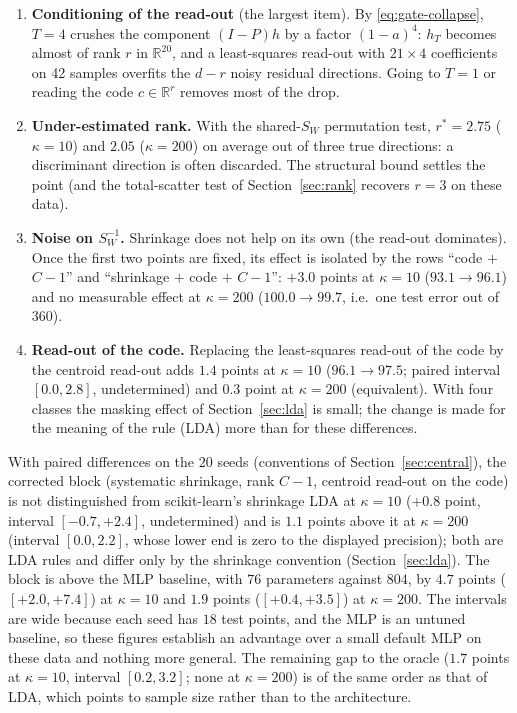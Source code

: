 \documentclass[11pt,a4paper]{article}
\theoremstyle{plain}
\theoremstyle{definition}
\theoremstyle{remark}
\newcommand{\R}{\mathbb R}
\begin{document}
\begin{enumerate}
  \item \textbf{Conditioning of the read-out} (the largest item). By
  \eqref{eq:gate-collapse}, $T=4$ crushes the component $(I-P)h$ by a factor
  $(1-a)^4$: $h_T$ becomes almost of rank $r$ in $\R^{20}$, and a
  least-squares read-out with $21\times4$ coefficients on 42 samples overfits
  the $d-r$ noisy residual directions. Going to $T=1$ or reading the code
  $c\in\R^r$ removes most of the drop.
  \item \textbf{Under-estimated rank.} With the shared-$S_W$ permutation
  test, $r^\ast=2.75$ ($\kappa=10$) and $2.05$ ($\kappa=200$) on average out
  of three true directions: a discriminant direction is often discarded. The
  structural bound settles the point (and the total-scatter test of
  Section~\ref{sec:rank} recovers $r=3$ on these data).
  \item \textbf{Noise on $S_W^{-1}$.} Shrinkage does not help on its own
  (the read-out dominates). Once the first two points are fixed, its effect
  is isolated by the rows ``code $+$ $C-1$'' and ``shrinkage $+$ code $+$
  $C-1$'': $+3.0$ points at $\kappa=10$ ($93.1\to96.1$) and no measurable
  effect at $\kappa=200$ ($100.0\to99.7$, i.e.\ one test error out of
  $360$).
  \item \textbf{Read-out of the code.} Replacing the least-squares read-out
  of the code by the centroid read-out adds $1.4$ points at $\kappa=10$
  ($96.1\to97.5$; paired interval $[0.0,2.8]$, undetermined) and $0.3$ point
  at $\kappa=200$ (equivalent). With four classes the masking effect of
  Section~\ref{sec:lda} is small; the change is made for the meaning of the
  rule (LDA) more than for these differences.
\end{enumerate}
With paired differences on the $20$ seeds (conventions of
Section~\ref{sec:central}), the corrected block (systematic shrinkage, rank
$C-1$, centroid read-out on the code) is not distinguished from
scikit-learn's shrinkage LDA at $\kappa=10$ ($+0.8$ point, interval
$[-0.7,+2.4]$, undetermined) and is $1.1$ points above it at $\kappa=200$
(interval $[0.0,2.2]$, whose lower end is zero to the displayed precision);
both are LDA rules and differ only by the shrinkage convention
(Section~\ref{sec:lda}). The block is above the MLP baseline, with $76$
parameters against $804$, by $4.7$ points ($[+2.0,+7.4]$) at $\kappa=10$
and $1.9$ points ($[+0.4,+3.5]$) at $\kappa=200$. The intervals are wide
because each seed has $18$ test points, and the MLP is an untuned
baseline, so these figures establish an advantage over a small default MLP
on these data and nothing more general. The remaining gap to the oracle
($1.7$ points at $\kappa=10$, interval $[0.2,3.2]$; none at $\kappa=200$)
is of the same order as that of LDA, which points to sample size rather
than to the architecture.
\end{document}
